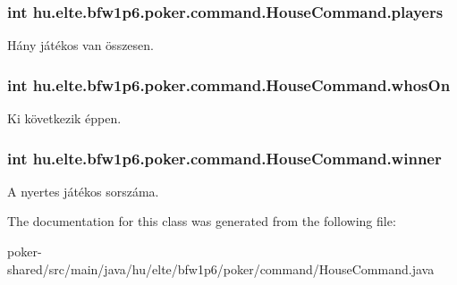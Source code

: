 \subsubsection[{players}]{\setlength{\rightskip}{0pt plus 5cm}int hu.\+elte.\+bfw1p6.\+poker.\+command.\+House\+Command.\+players\hspace{0.3cm}{\ttfamily [protected]}}\label{classhu_1_1elte_1_1bfw1p6_1_1poker_1_1command_1_1_house_command_a5aec73db52970865d234f95422258887}
Hány játékos van összesen. \hypertarget{classhu_1_1elte_1_1bfw1p6_1_1poker_1_1command_1_1_house_command_ad2d082dbec0a324d62472e5c48ef257f}{}
\subsubsection[{whos\+On}]{\setlength{\rightskip}{0pt plus 5cm}int hu.\+elte.\+bfw1p6.\+poker.\+command.\+House\+Command.\+whos\+On\hspace{0.3cm}{\ttfamily [protected]}}\label{classhu_1_1elte_1_1bfw1p6_1_1poker_1_1command_1_1_house_command_ad2d082dbec0a324d62472e5c48ef257f}
Ki következik éppen. \hypertarget{classhu_1_1elte_1_1bfw1p6_1_1poker_1_1command_1_1_house_command_a7dc7a32601c36758c216ddca0fc9999e}{}
\subsubsection[{winner}]{\setlength{\rightskip}{0pt plus 5cm}int hu.\+elte.\+bfw1p6.\+poker.\+command.\+House\+Command.\+winner\hspace{0.3cm}{\ttfamily [protected]}}\label{classhu_1_1elte_1_1bfw1p6_1_1poker_1_1command_1_1_house_command_a7dc7a32601c36758c216ddca0fc9999e}
A nyertes játékos sorszáma. 

The documentation for this class was generated from the following file\+:\begin{DoxyCompactItemize}
\item 
poker-\/shared/src/main/java/hu/elte/bfw1p6/poker/command/House\+Command.\+java\end{DoxyCompactItemize}
